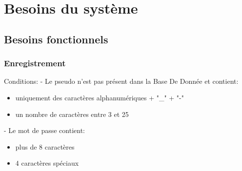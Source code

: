 \documentclass[french, utf8]{article}
\newcommand*{\MyIncludeGraphicsMaxSize}[2][]{%
\begin{adjustbox}{max size={\textwidth}{\textheight}}
    \texttt{[image: \#2]}%
\end{adjustbox}
}
\begin{document}
\section{Besoins du système}

\subsection{Besoins fonctionnels}
\begin{comment}
\subsubsection{Lancement}
\label{sec:Lancement}
Le programme, à son lancement,
affiche une fenêtre d'accueil contenant le titre du jeu et demande à l’utilisateur d'entrer :
\\un pseudo
\\un mot de passe

\MyIncludeGraphicsMaxSize{Image/connexion-sequence-shrodinger-user.png}


\end{comment}

\subsubsection{Enregistrement}
\label{sec:Enregistrement}
Conditions:
\newline
- Le pseudo n'est pas présent dans la Base De Donnée et contient:
\begin{itemize}
\item uniquement des caractères alphanumériques + "\_" + "-"
\item un nombre de caractères entre 3 et 25
\end{itemize}

- Le mot de passe contient:
\begin{itemize}
\item plus de 8 caractères
\item 4 caractères spéciaux
\end{itemize}
\end{document}
